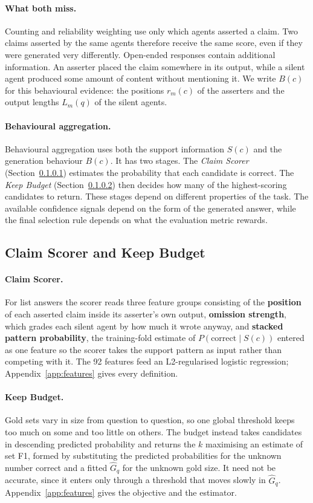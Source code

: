 \documentclass{article}
\begin{document}
\paragraph{What both miss.}
Counting and reliability weighting use only which agents asserted a claim. Two claims
asserted by the same agents therefore receive the same score, even if they were generated
very differently. Open-ended responses contain additional information. An asserter placed
the claim somewhere in its output, while a silent agent produced some amount of content
without mentioning it. We write $B(c)$ for this behavioural evidence: the positions
$r_m(c)$ of the asserters and the output lengths $L_m(q)$ of the silent agents.

\paragraph{Behavioural aggregation.}
Behavioural aggregation uses both the support information $S(c)$ and the generation
behaviour $B(c)$. It has two stages. The \emph{Claim Scorer}
(Section~\ref{sec:slotA}) estimates the probability that each candidate is correct. The
\emph{Keep Budget} (Section~\ref{sec:slotB}) then decides how many of the highest-scoring
candidates to return. These stages depend on different properties of the task. The
available confidence signals depend on the form of the generated answer, while the final
selection rule depends on what the evaluation metric rewards.

\subsection{Claim Scorer and Keep Budget}

\paragraph{Claim Scorer.}
\label{sec:slotA}
For list answers the scorer reads three feature groups consisting of the
\textbf{position} of each asserted claim inside its asserter's own output,
\textbf{omission strength}, which grades each silent agent by how much it wrote anyway,
and \textbf{stacked pattern probability}, the training-fold estimate of
$P(\mathrm{correct} \mid S(c))$ entered as one feature so the scorer takes the support
pattern as input rather than competing with it. The 92 features feed an L2-regularised
logistic regression; Appendix~\ref{app:features} gives every definition.

\paragraph{Keep Budget.}
\label{sec:slotB}
Gold sets vary in size from question to question, so one global threshold keeps too much
on some and too little on others. The budget instead takes candidates in descending
predicted probability and returns the $k$ maximising an estimate of set F1, formed by
substituting the predicted probabilities for the unknown number correct and a fitted
$\hat{G}_q$ for the unknown gold size. It need not be accurate, since it enters only
through a threshold that moves slowly in $\hat{G}_q$. Appendix~\ref{app:features} gives
the objective and the estimator.
\end{document}
